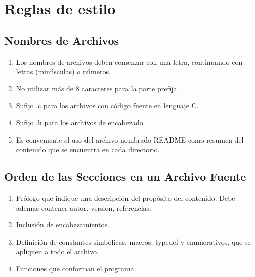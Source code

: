 \documentclass{article}
\begin{document}
\section{Reglas de estilo}
\subsection{Nombres de Archivos}
\begin{enumerate}
    \item Los nombres de archivos deben comenzar con una letra, continuando con letras (minúsculas) o números.
    \item No utilizar más de 8 caracteres para la parte prefija.
    \item Sufijo .c para los archivos con código fuente en lenguaje C.
    \item Sufijo .h para los archivos de encabezado.
    \item Es conveniente el uso del archivo nombrado README como resumen del contenido que se encuentra en cada directorio.
\end{enumerate}

\subsection{Orden de las Secciones en un Archivo Fuente}
\begin{enumerate}
    \item Prólogo que indique una descripción del propósito del contenido. Debe ademas contener autor, version, referencias.
    \item Inclusión de encabezamientos.
    \item Definición de constantes simbólicas, macros, typedef y enumerativos, que se apliquen a todo el archivo.
    \item Funciones que conforman el programa.
\end{enumerate}
\end{document}
